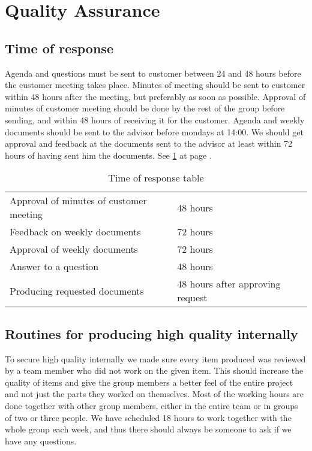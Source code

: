 \section{Quality Assurance}

\subsection{Time of response}
Agenda and questions must be sent to customer between 24 and 48 hours before the customer meeting takes place. 
Minutes of meeting should be sent to customer within 48 hours after the meeting, but preferably as soon as possible.
Approval of minutes of customer meeting should be done by the rest of the group before sending, and within 48 hours of receiving it for the customer. Agenda and weekly documents should be sent to the advisor before mondays at 14:00.
We should get approval and feedback at the documents sent to the advisor at least within 72 hours of having sent him the documents.
\newline
\newline
See \ref{tab:responsetable} at page \pageref{tab:responsetable}.

\begin{table}
\begin{tabular}{l|l}
Approval of minutes of customer meeting & 48 hours \\
Feedback on weekly documents & 72 hours \\
Approval of weekly documents & 72 hours \\
Answer to a question & 48 hours \\
Producing requested documents & 48 hours after approving request
\end{tabular}
\caption{Time of response table}\label{tab:responsetable}
\end{table}

\subsection{Routines for producing high quality internally}
To secure high quality internally we made sure every item produced was reviewed by a team member who did not work on the given item. This should increase the quality of items and give the group members a better feel of the entire project and not just the parts they worked on themselves. 
\newline
\newline
Most of the working hours are done together with other group members, either in the entire team or in groups of two or three people. We have scheduled 18 hours to work together with the whole group each week, and thus there should always be someone to ask if we have any questions.

